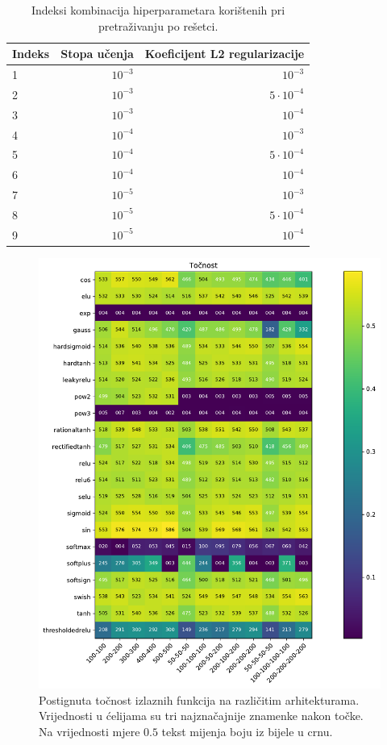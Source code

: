 \documentclass[times, utf8, numeric, diplomski]{fer}
\begin{document}
\begin{table}
\centering
\begin{tabular}{lrr}
Indeks & Stopa učenja & Koeficijent L2 regularizacije \\
\hline
1 & $10^{-3}$ & $10^{-3}$  \\
2 & $10^{-3}$ & $5 \cdot 10^{-4}$ \\
3 & $10^{-3}$ & $10^{-4}$ \\
4 & $10^{-4}$ & $10^{-3}$ \\
5 & $10^{-4}$ & $5 \cdot 10^{-4}$ \\
6 & $10^{-4}$ & $10^{-4}$ \\
7 & $10^{-5}$ & $10^{-3}$ \\
8 & $10^{-5}$ & $5 \cdot 10^{-4}$ \\
9 & $10^{-5}$ & $10^{-4}$
\end{tabular}
\caption{Indeksi kombinacija hiperparametara korištenih pri pretraživanju po rešetci.}
\label{tab:hp_256_comb}
\end{table}

\begin{figure}[ht]
\includegraphics[width=\textwidth]{greedy_256_acc.pdf}
\centering
\caption{Postignuta točnost izlaznih funkcija na različitim arhitekturama. Vrijednosti u ćelijama su tri najznačajnije znamenke nakon točke. Na vrijednosti mjere $0.5$ tekst mijenja boju iz bijele u crnu.}
\label{fig:greedy_256_acc}
\end{figure}
\end{document}
